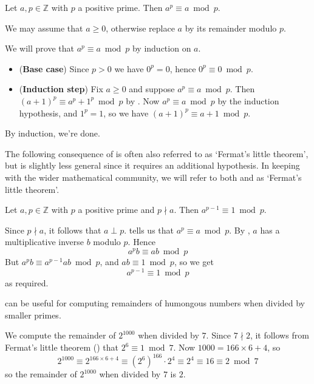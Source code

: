 \begin{theorem} \label{thmFermatLittle} 
Let $a,p \in \mathbb{Z}$ with $p$ a positive prime. Then $a^p \equiv a \bmod p$.
\end{theorem}
\begin{cproof}
We may assume that $a \ge 0$, otherwise replace $a$ by its remainder modulo $p$.

We will prove that $a^{p} \equiv a \bmod p$ by induction on $a$.
\begin{itemize}
\item (\textbf{Base case}) Since $p > 0$ we have $0^p=0$, hence $0^p \equiv 0 \bmod p$.
\item (\textbf{Induction step}) Fix $a \ge 0$ and suppose $a^p \equiv a \bmod p$. Then $(a+1)^p \equiv a^p+1^p \bmod p$ by . Now $a^p \equiv a \bmod p$ by the induction hypothesis, and $1^p = 1$, so we have $(a+1)^p \equiv a+1 \bmod p$.
\end{itemize}
By induction, we're done.
\end{cproof}

The following consequence of  is often also referred to as `Fermat's little theorem', but is slightly less general since it requires an additional hypothesis. In keeping with the wider mathematical community, we will refer to both  and  as `Fermat's little theorem'.

\begin{corollary}
\label{corFermatLittleAlt}
Let $a,p \in \mathbb{Z}$ with $p$ a positive prime and $p \nmid a$. Then $a^{p-1} \equiv 1 \bmod p$.
\end{corollary}
\begin{cproof}
Since $p \nmid a$, it follows that $a \perp p$.  tells us that $a^p \equiv a \bmod p$. By , $a$ has a multiplicative inverse $b$ modulo $p$. Hence
\[ a^{p}b \equiv ab \bmod p \]
But $a^{p}b \equiv a^{p-1}ab \bmod p$, and $ab \equiv 1 \bmod p$, so we get
\[ a^{p-1} \equiv 1 \bmod p \]
as required.
\end{cproof}

 can be useful for computing remainders of humongous numbers when divided by smaller primes.

\begin{example}
We compute the remainder of $2^{1000}$ when divided by $7$. Since $7 \nmid 2$, it follows from Fermat's little theorem () that $2^6 \equiv 1 \bmod 7$. Now $1000 = 166 \times 6 + 4$, so
\[ 2^{1000} \equiv 2^{166 \times 6 + 4} \equiv (2^6)^{166} \cdot 2^4 \equiv 2^4 \equiv 16 \equiv 2 \bmod 7 \]
so the remainder of $2^{1000}$ when divided by $7$ is $2$.
\end{example}

